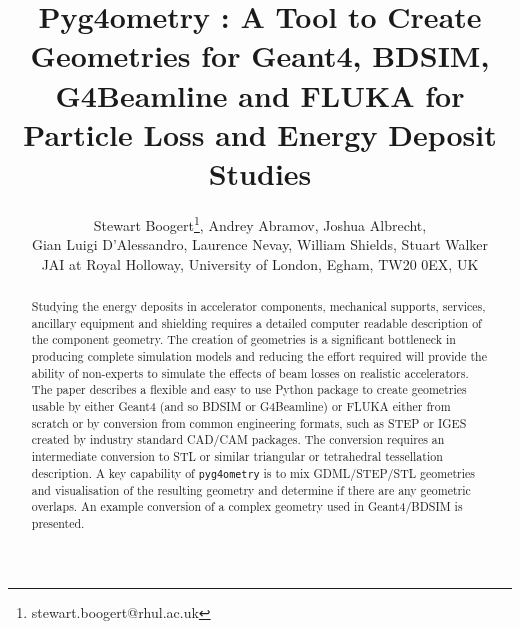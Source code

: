 \documentclass[a4paper,
               keeplastbox,   %
               ]{jacow}
\begin{document}
\title{Pyg4ometry : A Tool to Create Geometries for Geant4, BDSIM, G4Beamline and FLUKA for Particle Loss and Energy Deposit Studies}

\author{Stewart Boogert\thanks{stewart.boogert@rhul.ac.uk}, Andrey Abramov, Joshua Albrecht, \\ Gian Luigi D'Alessandro, Laurence Nevay, William Shields, Stuart Walker \\
JAI at Royal Holloway, University of London, Egham, TW20 0EX, UK}
	
\maketitle

%
\begin{abstract}
Studying the energy deposits in accelerator components, mechanical supports, services, ancillary equipment and shielding requires a detailed computer readable description of the component geometry. The creation of geometries is a significant bottleneck in producing complete simulation models and reducing the effort required will provide the ability of non-experts to simulate the effects of beam losses on realistic accelerators. The paper describes a flexible and easy to use Python package to create geometries usable by either Geant4 (and so BDSIM or G4Beamline) or FLUKA either from scratch or by conversion from common engineering formats, such as STEP or IGES created by industry standard CAD/CAM packages. The conversion requires an intermediate conversion to STL or similar triangular or tetrahedral tessellation description. A key capability of \verb|pyg4ometry| is to mix GDML/STEP/STL geometries and visualisation of the resulting geometry and determine if there are any geometric overlaps. An example conversion of a complex geometry used in Geant4/BDSIM is presented.
\end{abstract}
\end{document}

